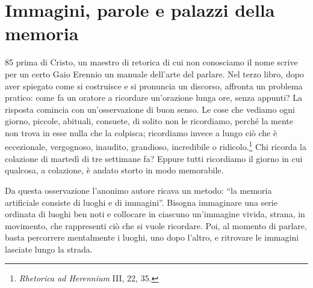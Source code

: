%
\chapter{Immagini, parole e palazzi della memoria}
\label{cap:immagini}


 85 prima di Cristo, un maestro di retorica di
cui non conosciamo il nome scrive per un certo Gaio Erennio un manuale
dell'arte del parlare. Nel terzo libro, dopo aver spiegato come si
costruisce e si pronuncia un discorso, affronta un problema pratico:
come fa un oratore a ricordare un'orazione lunga ore, senza appunti?
La risposta comincia con un'osservazione di buon senso. Le cose che
vediamo ogni giorno, piccole, abituali, consuete, di solito non le
ricordiamo, perché la mente non trova in esse nulla che la colpisca;
ricordiamo invece a lungo ciò che è eccezionale, vergognoso, inaudito,
grandioso, incredibile o ridicolo.\footnote{\emph{Rhetorica ad
Herennium} III, 22, 35.} Chi ricorda la colazione di martedì di tre
settimane fa? Eppure tutti ricordiamo il giorno in cui qualcosa, a
colazione, è andato storto in modo memorabile.

Da questa osservazione l'anonimo autore ricava un metodo:
\enquote{la memoria artificiale consiste di luoghi e di immagini}.
Bisogna immaginare una serie ordinata di luoghi ben noti e collocare in
ciascuno un'immagine vivida, strana, in movimento, che rappresenti ciò
che si vuole ricordare. Poi, al momento di parlare, basta percorrere
mentalmente i luoghi, uno dopo l'altro, e ritrovare le immagini lasciate
lungo la strada.

